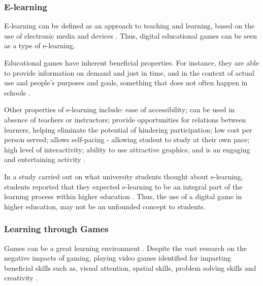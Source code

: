 \documentclass[a4paper,11.5pt]{report}
\numberwithin{figure}{section}
\numberwithin{table}{section}
\numberwithin{equation}{section}
\numberwithin{equation}{section}
\begin{document}
\subsubsection{E-learning}

E-learning can be defined as an approach to teaching and learning, based on the use of electronic media and devices \citep{sangra2012}. Thus, digital educational games can be seen as a type of e-learning.

Educational games have inherent beneficial properties. For instance, they are able to provide information on demand and just in time, and in the context of actual use and people's purposes and goals, something that does not often happen in schools \citep{Gee2003}.

Other properties of e-learning include: ease of accessibility; can be used in absence of teachers or instructors; provide opportunities for relations between learners, helping eliminate the potential of hindering participation; low cost per person served; allows self-pacing - allowing student to study at their own pace; high level of interactivity; ability to use attractive graphics, and is an engaging and entertaining activity \citep{arkorful2015, Girard2013}.

In a study carried out on what university students thought about e-learning, students reported that they expected e-learning to be an integral part of the learning process within higher education \citep{Connolly2012}. Thus, the use of a digital game in higher education, may not be an unfounded concept to students.



\subsubsection{Learning through Games}


Games can be a great learning environment \citep[see][]{prensky2003, Gee2003}. Despite the vast research on the negative impacts of gaming, playing video games identified for imparting beneficial skills such as, visual attention, spatial skills, problem solving skills and creativity \citep{Granic2014}. 
\end{document}
